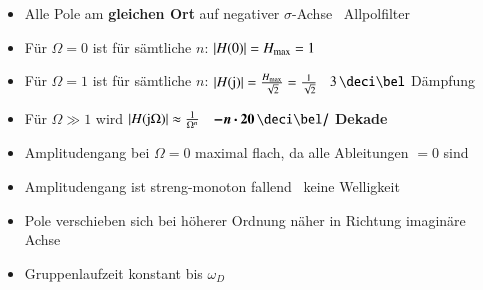 \begin{itemize}
    \item Alle Pole am \textbf{gleichen Ort} auf negativer $\sigma$-Achse \textrightarrow\ Allpolfilter
    \item Für $\Omega = 0$ ist für sämtliche $n$: $|H(0)| = H_{\rm max} = 1$
    \item Für $\Omega = 1$ ist für sämtliche $n$: $|H(\mathrm{j})| = \frac{H_{\rm max}}{\sqrt{2}} = \frac{1}{\sqrt{2}}$
        \textrightarrow\ $3 \, \deci \bel$ Dämpfung
    \item Für $\Omega \gg 1$ wird $|H(\mathrm{j} \Omega)| \approx \frac{1}{\Omega^n}$ \textrightarrow\ $\bm{- n \cdot 20 \, \deci \bel /}$ \textbf{Dekade}
    \item Amplitudengang bei $\Omega = 0$ maximal flach, da alle Ableitungen $=0$ sind
    \item Amplitudengang ist streng-monoton fallend \textrightarrow\ keine Welligkeit
    \item Pole verschieben sich bei höherer Ordnung näher in Richtung imaginäre Achse
    \item Gruppenlaufzeit konstant bis $\omega_D$
\end{itemize}


